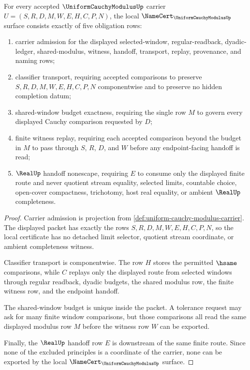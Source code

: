 \begin{theorem}\label{thm:uniform-cauchy-modulus-namecert-obligations}
For every accepted $\UniformCauchyModulusUp$ carrier $U=(S,R,D,M,W,E,H,C,P,N)$, the local $\NameCert_{\UniformCauchyModulusUp}$ surface consists exactly of five obligation rows:
\begin{enumerate}
\item carrier admission for the displayed selected-window, regular-readback, dyadic-ledger, shared-modulus, witness, handoff, transport, replay, provenance, and naming rows;
\item classifier transport, requiring accepted comparisons to preserve $S,R,D,M,W,E,H,C,P,N$ componentwise and to preserve no hidden completion datum;
\item shared-window budget exactness, requiring the single row $M$ to govern every displayed Cauchy comparison requested by $D$;
\item finite witness replay, requiring each accepted comparison beyond the budget in $M$ to pass through $S$, $R$, $D$, and $W$ before any endpoint-facing handoff is read;
\item $\RealUp$ handoff nonescape, requiring $E$ to consume only the displayed finite route and never quotient stream equality, selected limits, countable choice, open-cover compactness, trichotomy, host real equality, or ambient $\RealUp$ completeness.
\end{enumerate}
\end{theorem}
\begin{proof}
Carrier admission is projection from \autoref{def:uniform-cauchy-modulus-carrier}. The displayed packet has exactly the rows $S,R,D,M,W,E,H,C,P,N$, so the local certificate has no detached limit selector, quotient stream coordinate, or ambient completeness witness.

Classifier transport is componentwise. The row $H$ stores the permitted $\hsame$ comparisons, while $C$ replays only the displayed route from selected windows through regular readback, dyadic budgets, the shared modulus row, the finite witness row, and the endpoint handoff.

The shared-window budget is unique inside the packet. A tolerance request may ask for many finite window comparisons, but those comparisons all read the same displayed modulus row $M$ before the witness row $W$ can be exported.

Finally, the $\RealUp$ handoff row $E$ is downstream of the same finite route. Since none of the excluded principles is a coordinate of the carrier, none can be exported by the local $\NameCert_{\UniformCauchyModulusUp}$ surface.
\end{proof}

